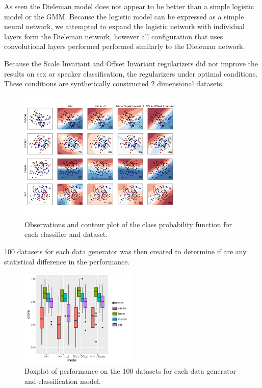 As seen the Dieleman model does not appear to be better than a simple logistic model or the GMM. Because the logistic model can be expressed as a simple neural network, we attempted to expand the logistic network with individual layers form the Dieleman network, however all configuration that uses convolutional layers performed performed similarly to the Dieleman network.

Because the Scale Invariant and Offset Invariant regularizers did not improve the results on sex or speaker classification, the regularizers under optimal conditions. These conditions are synthetically constructed 2 dimensional datasets. 

\begin{figure}[h]
	\centering
	\includegraphics[width=0.7\textwidth, trim = 0 2.2cm 0 2cm, clip]{plots/2d_classifier}
	\caption{Observations and contour plot of the class probability function for each classifier and dataset.}
\end{figure}

100 datasets for each data generator was then created to determine if are any statistical difference in the performance.

\begin{figure}[H]
	\centering
	\includegraphics[width=0.5\textwidth]{plots/2d_significant}
	\caption{Boxplot of performance on the 100 datasets for each data generator and classification model.}
\end{figure}

